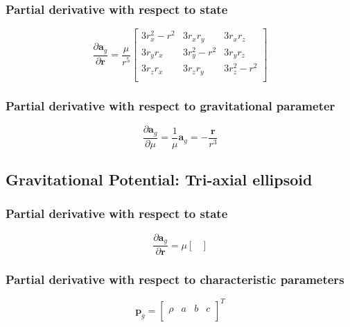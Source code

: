 \subsubsection{Partial derivative with respect to state}
\begin{equation}
    \frac{\partial{\bm{a}_{g}}}{\partial{\mathbf{r}}}  =
    \frac{\mu}{r^5}
    \begin{bmatrix}
    3r_x^2-r^2 & 3r_xr_y    & 3r_xr_z \\
    3r_yr_x    & 3r_y^2-r^2 & 3r_yr_z \\
    3r_zr_x    & 3r_zr_y    & 3r_z^2-r^2 \\
    \end{bmatrix}
    \label{eq:partial_point_mass_wrt_state}
\end{equation}

\subsubsection{Partial derivative with respect to gravitational parameter}
\begin{equation}
    \frac{\partial{\bm{a}_{g}}}{\partial{\mu}} =
    \frac{1}{\mu}\bm{a}_g =
    -\frac{\mathbf{r}}{r^3}
    \label{eq:partial_point_mass_wrt_G}
\end{equation}

\subsection{Gravitational Potential: Tri-axial ellipsoid}
\subsubsection{Partial derivative with respect to state}
\begin{equation}
    \frac{\partial{\bm{a}_{g}}}{\partial{\mathbf{r}}} =
    \mu 
    \begin{bmatrix}
    
    \end{bmatrix}
    \label{eq:partial_triaxial_wrt_state}
\end{equation}

\subsubsection{Partial derivative with respect to characteristic parameters}
\begin{equation}
    \mathbf{p}_{g}=
    \begin{bmatrix}
    \rho & a & b & c \\
    \end{bmatrix}^T
\end{equation}

